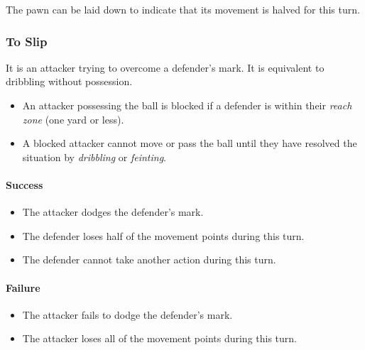 \documentclass[12pt]{article}
\begin{document}
\begin{hint}
The pawn can be laid down to indicate that its movement is halved for this turn.
\end{hint}

\subsubsection{To Slip}
It is an attacker trying to overcome a defender's mark. It is equivalent to dribbling without possession.

\begin{rulebox}
\begin{itemize}
\item An attacker possessing the ball is blocked if a defender is within their \emph{reach zone} (one yard or less).
\item A blocked attacker cannot move or pass the ball until they have resolved the situation by \emph{dribbling} or \emph{feinting}.
\end{itemize}
\end{rulebox}

\paragraph{Success}

\begin{rulebox}
\begin{itemize}
\item The attacker dodges the defender's mark.
\item The defender loses half of the movement points during this turn.
\item The defender cannot take another action during this turn.
\end{itemize}
\end{rulebox}

\paragraph{Failure}

\begin{rulebox}
\begin{itemize}
\item The attacker fails to dodge the defender's mark.
\item The attacker loses all of the movement points during this turn.
\end{itemize}
\end{rulebox}
\end{document}
